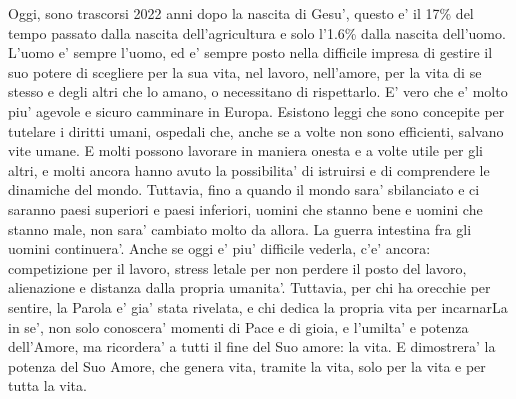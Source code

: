 {  Oggi, sono trascorsi 2022 anni dopo la nascita di Gesu', questo e' il 17\% del tempo passato dalla nascita dell'agricultura e solo l'1.6\% dalla nascita dell'uomo.
  L'uomo e' sempre l'uomo, ed e' sempre posto nella difficile impresa di gestire il suo potere di scegliere per la sua vita, nel lavoro, nell'amore, per la vita di se stesso e degli altri che lo amano, o necessitano di rispettarlo. 
E' vero che e' molto piu' agevole e sicuro camminare in Europa. Esistono leggi che sono concepite per tutelare i diritti umani, ospedali che, anche se a volte non sono efficienti, salvano vite umane. E molti possono lavorare in maniera onesta e a volte utile per gli altri, e molti ancora hanno avuto la possibilita' di istruirsi e di comprendere le dinamiche del mondo.
Tuttavia, fino a quando il mondo sara' sbilanciato e ci saranno paesi superiori e paesi inferiori, uomini che stanno bene e uomini che stanno male, non sara' cambiato molto da allora. La guerra intestina fra gli uomini continuera'. Anche se oggi e' piu' difficile vederla, c'e' ancora: competizione per il lavoro, stress letale per non perdere il posto del lavoro, alienazione e distanza dalla propria umanita'.
  Tuttavia, per chi ha orecchie per sentire, la Parola e' gia' stata rivelata, e chi dedica la propria vita per incarnarLa in se', non solo conoscera' momenti di Pace e di gioia, e l'umilta' e potenza dell'Amore, ma ricordera' a tutti il fine del Suo amore: la vita. E dimostrera' la potenza del Suo Amore, che genera vita, tramite la vita, solo per la vita e per tutta la vita.}



